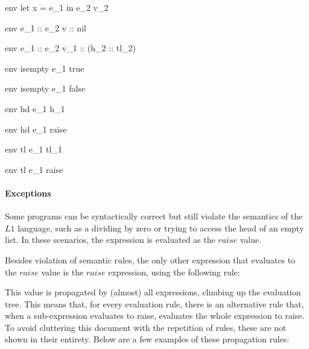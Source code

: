 \documentclass{article}
\begin{document}
	{\mbox{env} \vdash let \; x = e_1 \; in \; e_2 \Downarrow v_2}
	
\bigskip


	{\mbox{env} \vdash e_1 :: e_2 \Downarrow v :: nil}
	
	{\mbox{env} \vdash e_1 :: e_2 \Downarrow v_1 :: (h_2 :: tl_2)}
	
\medskip

	{\mbox{env} \vdash isempty \; e_1 \Downarrow true}
	
	{\mbox{env} \vdash isempty \; e_1 \Downarrow false}

	{\mbox{env} \vdash hd \; e_1 \Downarrow h_1}

	{\mbox{env} \vdash hd \; e_1 \Downarrow raise}
		
	{\mbox{env} \vdash tl \; e_1 \Downarrow tl_1}

	{\mbox{env} \vdash tl \; e_1 \Downarrow raise}
	
\paragraph{Exceptions}

Some programs can be syntactically correct but still violate the semantics of the $L1$ language, such as a dividing by zero or trying to access the head of an empty list.
In these scenarios, the expression is evaluated as the $raise$ value. 

Besides violation of semantic rules, the only other expression that evaluates to the $raise$ value is the $raise$ expression, using the following rule:


This value is propagated by (almost) all expressions, climbing up the evaluation tree.
This means that, for every evaluation rule, there is an alternative rule that, when a sub-expression evaluates to raise, evaluates the whole expression to raise.
To avoid cluttering this document with the repetition of rules, these are not shown in their entirety. 
Below are a few examples of these propagation rules:
\end{document}
